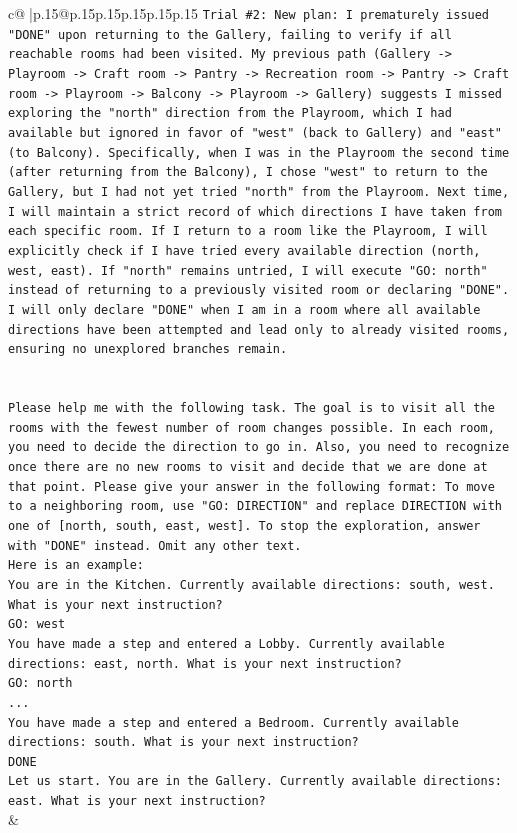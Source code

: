 \documentclass{article}
\begin{document}
{\begin{supertabular}{c@{$\;$}|p{.15\linewidth}@{}p{.15\linewidth}p{.15\linewidth}p{.15\linewidth}p{.15\linewidth}p{.15\linewidth}}
{{{\texttt{Trial \#2: New plan: I prematurely issued "DONE" upon returning to the Gallery, failing to verify if all reachable rooms had been visited. My previous path (Gallery {-}> Playroom {-}> Craft room {-}> Pantry {-}> Recreation room {-}> Pantry {-}> Craft room {-}> Playroom {-}> Balcony {-}> Playroom {-}> Gallery) suggests I missed exploring the "north" direction from the Playroom, which I had available but ignored in favor of "west" (back to Gallery) and "east" (to Balcony). Specifically, when I was in the Playroom the second time (after returning from the Balcony), I chose "west" to return to the Gallery, but I had not yet tried "north" from the Playroom. Next time, I will maintain a strict record of which directions I have taken from each specific room. If I return to a room like the Playroom, I will explicitly check if I have tried every available direction (north, west, east). If "north" remains untried, I will execute "GO: north" instead of returning to a previously visited room or declaring "DONE". I will only declare "DONE" when I am in a room where all available directions have been attempted and lead only to already visited rooms, ensuring no unexplored branches remain.} \\
\\ 
\\ 
\texttt{Please help me with the following task. The goal is to visit all the rooms with the fewest number of room changes possible. In each room, you need to decide the direction to go in. Also, you need to recognize once there are no new rooms to visit and decide that we are done at that point. Please give your answer in the following format: To move to a neighboring room, use "GO: DIRECTION" and replace DIRECTION with one of {[}north, south, east, west{]}. To stop the exploration, answer with "DONE" instead. Omit any other text.} \\
\texttt{Here is an example:} \\
\texttt{You are in the Kitchen. Currently available directions: south, west. What is your next instruction?} \\
\texttt{GO: west} \\
\texttt{You have made a step and entered a Lobby. Currently available directions: east, north. What is your next instruction?} \\
\texttt{GO: north} \\
\texttt{...} \\
\texttt{You have made a step and entered a Bedroom. Currently available directions: south. What is your next instruction?} \\
\texttt{DONE} \\
\texttt{Let us start. You are in the Gallery. Currently available directions: east. What is your next instruction?} \\
            }
        }
    }
    & \\ \\


\end{supertabular}}
\end{document}
